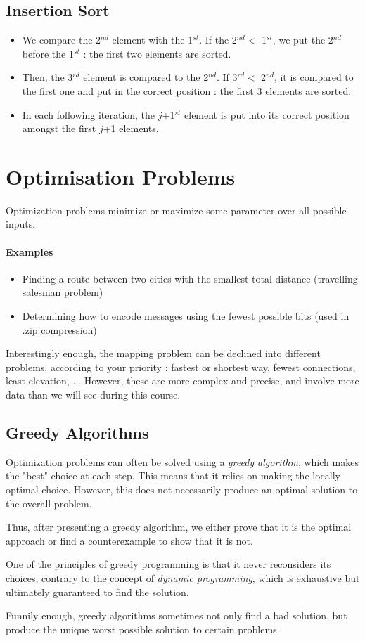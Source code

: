 \documentclass[10pt,a4paper]{book}
\newcommand{\ind}{\hspace*{\parindent}}
\begin{document}
\subsection{Insertion Sort}
\begin{itemize}
\item We compare the 2$^{nd}$ element with the 1$^{st}$. If the 2$^{nd} <$ 1$^{st}$, we put the 2$^{nd}$ before the 1$^{st}$ : the first two elements are sorted.
\item Then, the 3$^{rd}$ element is compared to the 2$^{nd}$. If 3$^{rd} <$ 2$^{nd}$, it is compared to the first one and put in the correct position : the first 3 elements are sorted.
\item In each following iteration, the $j$+1$^{st}$ element is put into its correct position amongst the first $j$+1 elements.
\end{itemize}

\section{Optimisation Problems}
Optimization problems minimize or maximize some parameter over all possible inputs. 
\paragraph*{Examples}
\begin{itemize}
\item Finding a route between two cities with the smallest total distance (travelling salesman problem)
\item Determining how to encode messages using the fewest possible bits (used in .zip compression)
\end{itemize}
Interestingly enough, the mapping problem can be declined into different problems, according to your priority : fastest or shortest way, fewest connections, least elevation, ... However, these are more complex and precise, and involve more data than we will see during this course.

\subsection{Greedy Algorithms}
\ind Optimization problems can often be solved using a \textit{greedy algorithm}, which makes the "best" choice at each step. This means that it relies on making the locally optimal choice. However, this does not necessarily produce an optimal solution to the overall problem.\par
Thus, after presenting a greedy algorithm, we either prove that it is the optimal approach or find a counterexample to show that it is not.\par
One of the principles of greedy programming is that it never reconsiders its choices, contrary to the concept of \textit{dynamic programming}, which is exhaustive but ultimately guaranteed to find the solution.\par
Funnily enough, greedy algorithms sometimes not only find a bad solution, but produce the unique worst possible solution to certain problems.
\end{document}
